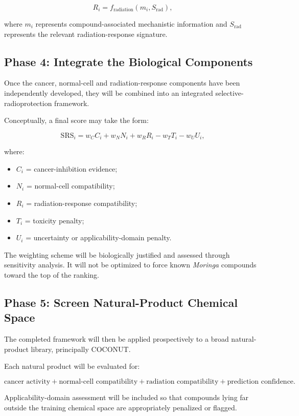 \documentclass[11pt,a4paper]{article}
\begin{document}
\[
R_i = f_{\mathrm{radiation}}(m_i,S_{\mathrm{rad}}),
\]

where $m_i$ represents compound-associated mechanistic information and $S_{\mathrm{rad}}$ represents the relevant radiation-response signature.

\subsection{Phase 4: Integrate the Biological Components}

Once the cancer, normal-cell and radiation-response components have been independently developed, they will be combined into an integrated selective-radioprotection framework.

Conceptually, a final score may take the form:

\[
\mathrm{SRS}_i =
w_C C_i +
w_N N_i +
w_R R_i -
w_T T_i -
w_U U_i,
\]

where:

\begin{itemize}[leftmargin=1.6em]
    \item $C_i$ = cancer-inhibition evidence;
    \item $N_i$ = normal-cell compatibility;
    \item $R_i$ = radiation-response compatibility;
    \item $T_i$ = toxicity penalty;
    \item $U_i$ = uncertainty or applicability-domain penalty.
\end{itemize}

The weighting scheme will be biologically justified and assessed through sensitivity analysis. It will not be optimized to force known \textit{Moringa} compounds toward the top of the ranking.

\subsection{Phase 5: Screen Natural-Product Chemical Space}

The completed framework will then be applied prospectively to a broad natural-product library, principally COCONUT.

Each natural product will be evaluated for:

\[
\text{cancer activity}
+
\text{normal-cell compatibility}
+
\text{radiation compatibility}
+
\text{prediction confidence}.
\]

Applicability-domain assessment will be included so that compounds lying far outside the training chemical space are appropriately penalized or flagged.
\end{document}
